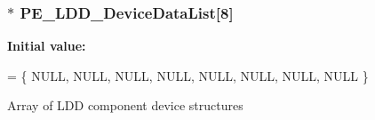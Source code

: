 \subsubsection[{\texorpdfstring{P\+E\+\_\+\+L\+D\+D\+\_\+\+Device\+Data\+List}{PE_LDD_DeviceDataList}}]{$\ast$ P\+E\+\_\+\+L\+D\+D\+\_\+\+Device\+Data\+List\mbox{[}8\mbox{]}}\hypertarget{group___p_e___l_d_d__module_ga82b60cfd279bc3cf17d8c2ebe030eac8}{}\label{group___p_e___l_d_d__module_ga82b60cfd279bc3cf17d8c2ebe030eac8}
{\bfseries Initial value\+:}
\begin{DoxyCode}
= \{
    NULL,
    NULL,
    NULL,
    NULL,
    NULL,
    NULL,
    NULL,
    NULL
  \}
\end{DoxyCode}
Array of L\+DD component device structures 